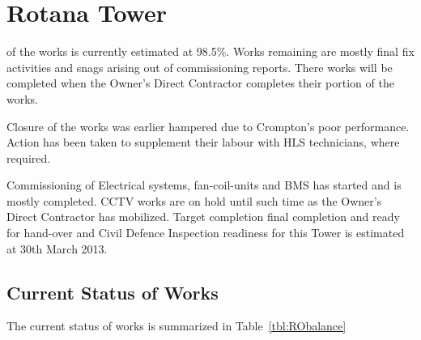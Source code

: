 \chapter{Rotana Tower}

 of the works is currently estimated at 98.5\%. Works remaining are mostly final fix activities and snags arising out of commissioning reports. There works will be completed when the Owner's Direct Contractor completes their portion of the works. 

Closure of the works was earlier hampered due to  Crompton's poor performance. Action has been taken to supplement their labour with HLS technicians, where required.

Commissioning of Electrical systems, fan-coil-units and BMS has started and is mostly completed.  CCTV works are on hold until such time as the Owner's Direct Contractor has mobilized. Target completion final completion and ready for hand-over and Civil Defence Inspection readiness for this Tower is estimated at 30th March 2013. 


\section{Current Status of Works}

The current status of works is summarized in Table~\ref{tbl:RObalance}

\bigskip

